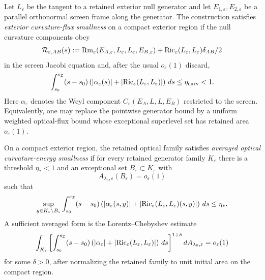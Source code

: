 \begin{definition}\label{def:ExteriorCurvatureFluxSmallness}
Let $L_\varepsilon$ be the tangent to a retained exterior null generator and let $E_{1,\varepsilon},E_{2,\varepsilon}$ be a parallel orthonormal screen frame along the generator. The construction satisfies \emph{exterior curvature-flux smallness} on a compact exterior region if the null curvature components obey
\[
    \mathcal R_{\varepsilon,AB}(s)
    :=
    \mathrm{Rm}_\varepsilon(E_{A,\varepsilon},L_\varepsilon,L_\varepsilon,E_{B,\varepsilon})
    + \mathrm{Ric}_\varepsilon(L_\varepsilon,L_\varepsilon)\delta_{AB}/2
\]
in the screen Jacobi equation and, after the usual $o_\varepsilon(1)$ discard,
\[
    \int_{s_0}^{s_{\mathcal{I}}}
    (s-s_0)
    \left(
        |\alpha_\varepsilon(s)|
        +|\mathrm{Ric}_\varepsilon(L_\varepsilon,L_\varepsilon)|
    \right)\,ds
    \le \eta_{\mathrm{curv}}<1 .
\]
Here $\alpha_\varepsilon$ denotes the Weyl component $C_\varepsilon(E_A,L,L,E_B)$ restricted to the screen. Equivalently, one may replace the pointwise generator bound by a uniform weighted optical-flux bound whose exceptional superlevel set has retained area $o_\varepsilon(1)$.
\end{definition}

\begin{definition}\label{def:AveragedOpticalCurvatureEnergySmallness}
On a compact exterior region, the retained optical family satisfies \emph{averaged optical curvature-energy smallness} if for every retained generator family $K_\varepsilon$ there is a threshold $\eta_*<1$ and an exceptional set $B_\varepsilon\subset K_\varepsilon$ with
\[
    A_{\lambda_0,\varepsilon}(B_\varepsilon)=o_\varepsilon(1)
\]
such that
\[
    \sup_{y\in K_\varepsilon\setminus B_\varepsilon}
    \int_{s_0}^{s_{\mathcal{I}}}
    (s-s_0)
    \left(
        |\alpha_\varepsilon(s,y)|
        +|\mathrm{Ric}_\varepsilon(L_\varepsilon,L_\varepsilon)(s,y)|
    \right)\,ds
    \le \eta_* .
\]
A sufficient averaged form is the Lorentz--Chebyshev estimate
\[
    \int_{K_\varepsilon}
    \left[
    \int_{s_0}^{s_{\mathcal{I}}}
    (s-s_0)
    \left(
        |\alpha_\varepsilon|
        +|\mathrm{Ric}_\varepsilon(L_\varepsilon,L_\varepsilon)|
    \right)\,ds
    \right]^{1+\delta}
    dA_{\lambda_0,\varepsilon}
    =
    o_\varepsilon(1)
\]
for some $\delta>0$, after normalizing the retained family to unit initial area on the compact region.
\end{definition}

